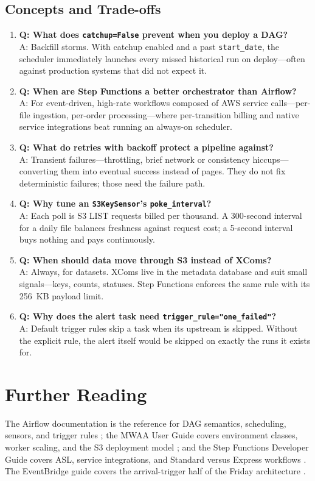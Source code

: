 \subsection{Concepts and Trade-offs}
\begin{enumerate}
    \item \textbf{Q: What does \texttt{catchup=False} prevent when you deploy a DAG?}\\
    A: Backfill storms. With catchup enabled and a past \texttt{start\_date}, the scheduler immediately launches every missed historical run on deploy---often against production systems that did not expect it.
    \item \textbf{Q: When are Step Functions a better orchestrator than Airflow?}\\
    A: For event-driven, high-rate workflows composed of AWS service calls---per-file ingestion, per-order processing---where per-transition billing and native service integrations beat running an always-on scheduler.
    \item \textbf{Q: What do retries with backoff protect a pipeline against?}\\
    A: Transient failures---throttling, brief network or consistency hiccups---converting them into eventual success instead of pages. They do not fix deterministic failures; those need the failure path.
    \item \textbf{Q: Why tune an \texttt{S3KeySensor}'s \texttt{poke\_interval}?}\\
    A: Each poll is S3 LIST requests billed per thousand. A 300-second interval for a daily file balances freshness against request cost; a 5-second interval buys nothing and pays continuously.
    \item \textbf{Q: When should data move through S3 instead of XComs?}\\
    A: Always, for datasets. XComs live in the metadata database and suit small signals---keys, counts, statuses. Step Functions enforces the same rule with its 256~KB payload limit.
    \item \textbf{Q: Why does the alert task need \texttt{trigger\_rule="one\_failed"}?}\\
    A: Default trigger rules skip a task when its upstream is skipped. Without the explicit rule, the alert itself would be skipped on exactly the runs it exists for.
\end{enumerate}

\section{Further Reading}
The Airflow documentation is the reference for DAG semantics, scheduling, sensors, and trigger rules \cite{apacheAirflow}; the MWAA User Guide covers environment classes, worker scaling, and the S3 deployment model \cite{awsMWAADocs}; and the Step Functions Developer Guide covers ASL, service integrations, and Standard versus Express workflows \cite{awsStepFunctionsDocs}. The EventBridge guide covers the arrival-trigger half of the Friday architecture \cite{awsEventBridgeDocs}.

